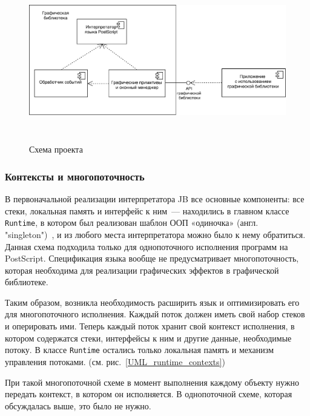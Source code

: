 	\begin{figure} [h]
			\includegraphics[height=200pt]{Pozdin/Project_scheme.png}
			\caption{Схема проекта}\label{project_scheme}
	\end{figure}

	\subsubsection*{Контексты и многопоточность}
	В первоначальной реализации интерпретатора JB все основные компоненты: все стеки, локальная память и интерфейс к ним~--- находились в главном классе \texttt{Runtime}, в котором был реализован шаблон ООП «одиночка» (англ. "singleton")~\cite{patterns}, и из любого места интерпретатора можно было к нему обратиться. Данная схема подходила только для однопоточного исполнения программ на PostScript. Спецификация языка вообще не предусматривает многопоточность, которая необходима для реализации графических эффектов в графической библиотеке.
		
	Таким образом, возникла необходимость расширить язык и оптимизировать его для многопоточного исполнения. Каждый поток должен иметь свой набор стеков и оперировать ими. Теперь каждый поток хранит свой контекст исполнения, в котором  содержатся стеки, интерфейсы к ним и другие данные, необходимые потоку. В классе \texttt{Runtime}  остались только локальная память и механизм управления потоками. (см. рис.~\ref{UML_runtime_contexts}) 
		
	При такой многопоточной схеме в момент выполнения  каждому объекту нужно передать контекст, в котором он исполняется. В однопоточной схеме, которая обсуждалась выше, это было не нужно.
		
		

